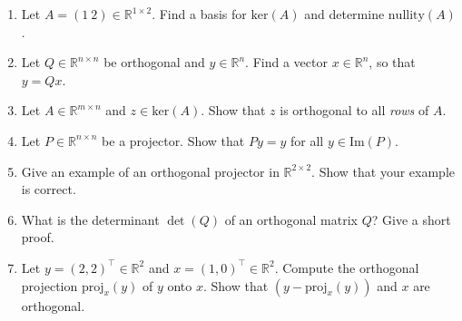 \vspace*{-0.5cm}
\begin{enumerate}
	\item Let $A = (1 ~2) \in \mathbb{R}^{1 \times 2}$. Find a basis for $\text{ker}(A) $ and determine $\text{nullity}(A)$.
	\item Let $Q \in \mathbb{R}^{n \times n}$ be orthogonal and $y \in\mathbb{R}^{n}$. Find a vector $x \in\mathbb{R}^{n}$, so that $y = Qx$.
	\item Let $A \in \mathbb{R}^{m \times n}$ and  $z \in \text{ker}(A)$. Show that $z$ is orthogonal to all \textit{rows} of $A$.
	\item Let $P\in\mathbb{R}^{n\times n}$ be a projector. Show that $Py = y$ for all $y \in \text{Im}(P)$.
	\item Give an example of an orthogonal projector in $\mathbb{R}^{2\times 2}$. Show that your example is correct.
	\item What is the determinant $\det(Q)$ of an orthogonal matrix $Q$? Give a short proof.
	\item Let  $y=(2,2)^\top \in \mathbb{R}^{2}$ and $x=(1,0)^\top\in \mathbb{R}^{2}$. Compute the orthogonal projection $\text{proj}_x(y) $ of $y$ onto $x$. Show that $(y - \text{proj}_x(y))$ and $x$ are orthogonal.
\end{enumerate}
 